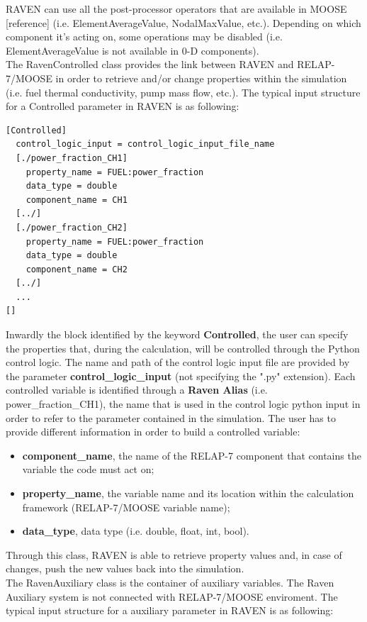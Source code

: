 \documentclass{mc2013}
\begin{document}
RAVEN can use all the post-processor operators that are available in MOOSE [reference] (i.e. ElementAverageValue, NodalMaxValue, etc.). Depending on which component it's acting on, some operations may be disabled (i.e. ElementAverageValue is not available in 0-D components).
\\The RavenControlled class provides the link between RAVEN and RELAP-7/MOOSE in order to retrieve and/or change properties within the simulation (i.e. fuel thermal conductivity, pump mass flow, etc.). The typical input structure for a Controlled parameter in RAVEN is as following:
\begin{lstlisting}
[Controlled]
  control_logic_input = control_logic_input_file_name
  [./power_fraction_CH1]
    property_name = FUEL:power_fraction
    data_type = double
    component_name = CH1
  [../]
  [./power_fraction_CH2]
    property_name = FUEL:power_fraction
    data_type = double
    component_name = CH2
  [../]
  ...
[]
\end{lstlisting}
Inwardly the block identified by the keyword \textbf{Controlled}, the user can specify the properties that, during the calculation, will be controlled through the Python control logic. The name and path of the control logic input file are provided by the parameter  \textbf{control\_logic\_input} (not specifying the ".py" extension). Each controlled variable is identified through a \textbf{Raven Alias} (i.e. power\_fraction\_CH1), the name that is used in the control logic python input in order to refer to the parameter contained in the simulation.
The user has to provide different information in order to build a controlled variable:
\begin{itemize}
  \item \textbf{component\_name}, the name of the RELAP-7 component that contains the variable the code must act on;
  \item \textbf{property\_name}, the variable name and its location within the calculation framework (RELAP-7/MOOSE variable name);
  \item \textbf{data\_type}, data type (i.e. double, float, int, bool).
\end{itemize}
Through this class, RAVEN is able to retrieve property values and, in case of changes, push the new values back into the simulation. 
\\The RavenAuxiliary class is the container of auxiliary variables. The Raven Auxiliary system is not connected with RELAP-7/MOOSE enviroment. The typical input structure for a auxiliary parameter in RAVEN is as following:
\end{document}
